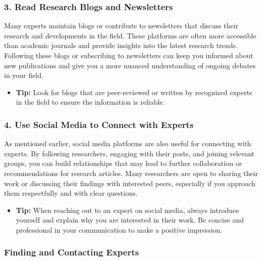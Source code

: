 \documentclass[
]{book}
\providecommand{\tightlist}{%
  \setlength{\itemsep}{0pt}\setlength{\parskip}{0pt}}
\begin{document}
\subsubsection*{3. Read Research Blogs and Newsletters}\label{read-research-blogs-and-newsletters}

Many experts maintain blogs or contribute to newsletters that discuss their research and developments in the field. These platforms are often more accessible than academic journals and provide insights into the latest research trends. Following these blogs or subscribing to newsletters can keep you informed about new publications and give you a more nuanced understanding of ongoing debates in your field.

\begin{itemize}
\tightlist
\item
  \textbf{Tip:} Look for blogs that are peer-reviewed or written by recognized experts in the field to ensure the information is reliable.
\end{itemize}

\subsubsection*{4. Use Social Media to Connect with Experts}\label{use-social-media-to-connect-with-experts}

As mentioned earlier, social media platforms are also useful for connecting with experts. By following researchers, engaging with their posts, and joining relevant groups, you can build relationships that may lead to further collaboration or recommendations for research articles. Many researchers are open to sharing their work or discussing their findings with interested peers, especially if you approach them respectfully and with clear questions.

\begin{itemize}
\tightlist
\item
  \textbf{Tip:} When reaching out to an expert on social media, always introduce yourself and explain why you are interested in their work. Be concise and professional in your communication to make a positive impression.
\end{itemize}

\subsubsection*{Finding and Contacting Experts}\label{finding-and-contacting-experts}
\end{document}
